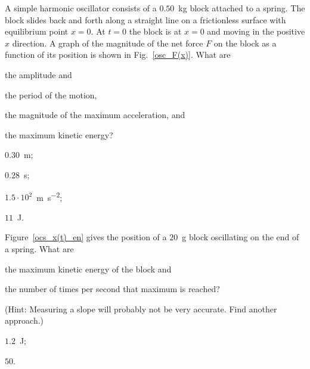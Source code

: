 \begin{problem}\label{prb:osc_F(x)}
	A simple harmonic oscillator consists of a $0.50$~kg block attached to a spring. The block slides back and forth along a straight line on a frictionless surface with equilibrium point $x = 0$. At $t = 0$ the block is at $x = 0$ and moving in the positive $x$ direction. A graph of the magnitude of the net force $F$ on the block as a function of its position is shown in Fig.~\ref{osc_F(x)}. What are 
	\begin{enumerate*}[label=(\alph*)]
		\item the amplitude and
		\item the period of the motion,
		\item the magnitude of the maximum acceleration, and
		\item the maximum kinetic energy?
	\end{enumerate*}
	\begin{solution}
		\begin{enumerate*}[label=(\alph*)]
			\item $0.30$~m; 
			\item $0.28$~s; 
			\item $1.5 \cdot 10^2$~\si{\meter\per\square\second}; 
			\item $11$~J.
		\end{enumerate*}
	\end{solution}
\end{problem}


\begin{problem}\label{prb:ocs_x(t)_en}
	Figure~\ref{ocs_x(t)_en} gives the position of a $20$~g block oscillating on the end of a spring.  What are 
	\begin{enumerate*}[label=(\alph*)]
		\item the maximum kinetic energy of the block and
		\item the number of times per second that maximum is reached?		
	\end{enumerate*}
(Hint: Measuring a slope will probably not be very accurate. Find another approach.)
	\begin{solution}
		\begin{enumerate*}[label=(\alph*)]
			\item $1.2$~J;
			\item $50$.
		\end{enumerate*}
	\end{solution}
\end{problem}

